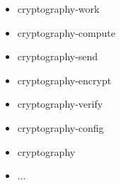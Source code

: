 \begin{appendices}
\begin{figure}[H]
{\begin{itemize}
    \item cryptography-work
    \item cryptography-compute
    \item cryptography-send
    \item cryptography-encrypt
    \item cryptography-verify
    \item cryptography-config
    \item cryptography
    \item ...







	\end{itemize}
	}
   \endminipage
\endminipage
{}%
  

\end{figure}
\end{appendices}

